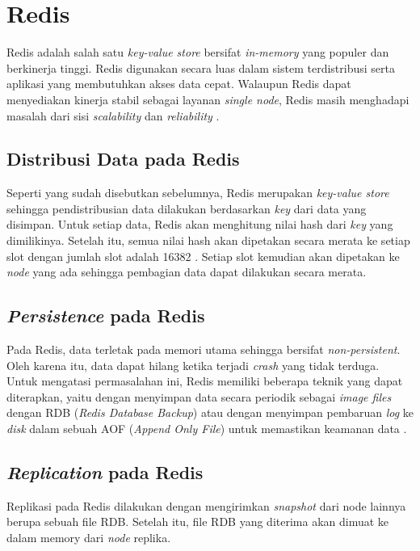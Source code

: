\section{Redis}

Redis adalah salah satu \textit{key-value store} bersifat \textit{in-memory} yang populer dan berkinerja tinggi. Redis digunakan secara luas dalam sistem terdistribusi serta aplikasi yang membutuhkan akses data cepat. Walaupun Redis dapat menyediakan kinerja stabil sebagai layanan \textit{single node}, Redis masih menghadapi masalah dari sisi \textit{scalability} dan \textit{reliability} \parencite{chen2016towards}.

\subsection{Distribusi Data pada Redis}
Seperti yang sudah disebutkan sebelumnya, Redis merupakan \textit{key-value store} sehingga pendistribusian data dilakukan berdasarkan \textit{key} dari data yang disimpan. Untuk setiap data, Redis akan menghitung nilai hash dari \textit{key} yang dimilikinya. Setelah itu, semua nilai hash akan dipetakan secara merata ke setiap slot dengan jumlah slot adalah 16382 \parencite{chen2016towards}. Setiap slot kemudian akan dipetakan ke \textit{node} yang ada sehingga pembagian data dapat dilakukan secara merata.

\subsection{\textit{Persistence} pada Redis}
Pada Redis, data terletak pada memori utama sehingga bersifat \textit{non-persistent}. Oleh karena itu, data dapat hilang ketika terjadi \textit{crash} yang tidak terduga. Untuk mengatasi permasalahan ini, Redis memiliki beberapa teknik yang dapat diterapkan, yaitu dengan menyimpan data secara periodik sebagai \textit{image files} dengan RDB (\textit{Redis Database Backup}) atau dengan menyimpan pembaruan \textit{log} ke \textit{disk} dalam sebuah AOF (\textit{Append Only File}) untuk memastikan keamanan data \parencite{chen2016towards}.

\subsection{\textit{Replication} pada Redis}
Replikasi pada Redis dilakukan dengan mengirimkan \textit{snapshot} dari node lainnya berupa sebuah file RDB. Setelah itu, file RDB yang diterima akan dimuat ke dalam memory dari \textit{node} replika.
